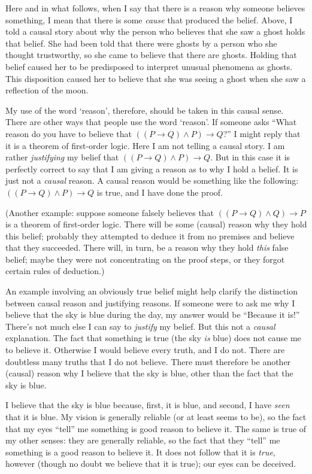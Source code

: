 \documentclass[11pt]{article}
\begin{document}
\begin{spacing}{1.5}
Here and in what follows, when I say that there is a reason why
someone believes something, I mean that there is some {\em cause} that
produced the belief.  Above, I told a causal story about why the
person who believes that she saw a ghost holds that belief.  She had
been told that there were ghosts by a person who she thought
trustworthy, so she came to believe that there are ghosts.  Holding
that belief caused her to be predisposed to interpret unusual
phenomena as ghosts.  This disposition caused her to believe that she
was seeing a ghost when she saw a reflection of the moon.

My use of the word `reason', therefore, should be taken in this causal
sense.  There are other ways that people use the word `reason'.  If
someone asks ``What reason do you have to believe that $((P
\rightarrow Q ) \wedge P) \rightarrow Q$?''  I might reply that it is
a theorem of first-order logic.  Here I am not telling a causal story.
I am rather {\em justifying} my belief that $((P \rightarrow Q )
\wedge P) \rightarrow Q$.  But in this case it is perfectly correct to
say that I am giving a reason as to why I hold a belief.  It is just
not a {\em causal} reason.  A causal reason would be something like
the following: $((P \rightarrow Q ) \wedge P) \rightarrow Q$ is true,
and I have done the proof.

(Another example: suppose someone falsely believes that $((P
\rightarrow Q ) \wedge Q) \rightarrow P$ is a theorem of first-order
logic.  There will be some (causal) reason why they hold this belief;
probably they attempted to deduce it from no premises and believe that
they succeeded.  There will, in turn, be a reason why they hold {\em
  this} false belief; maybe they were not concentrating on the proof
steps, or they forgot certain rules of deduction.)

An example involving an obviously true belief might help clarify the
distinction between causal reason and justifying reasons.  If someone
were to ask me why I believe that the sky is blue during the day, my
answer would be ``Because it is!''  There's not much else I can say to
{\em justify} my belief.  But this not a {\em causal} explanation.
The fact that something is true (the sky {\em is} blue) does not cause
me to believe it.  Otherwise I would believe every truth, and I do
not.  There are doubtless many truths that I do not believe.  There
must therefore be another (causal) reason why I believe that the sky
is blue, other than the fact that the sky is blue.

I believe that the sky is blue because, first, it is blue, and second,
I have {\em seen} that it is blue.  My vision is generally reliable
(or at least seems to be), so the fact that my eyes ``tell'' me
something is good reason to believe it.  The same is true of my other
senses: they are generally reliable, so the fact that they ``tell'' me
something is a good reason to believe it.  It does not follow that it
is {\em true}, however (though no doubt we believe that it is true);
our eyes can be deceived.


\end{spacing}
\end{document}
